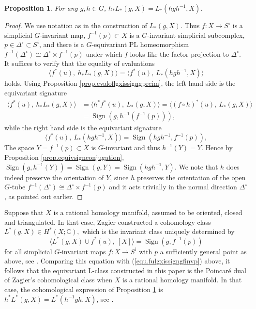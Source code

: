 \documentclass{amsart}
\newtheorem{prop}[thm]{Proposition}
\theoremstyle{definition}
\theoremstyle{remark}
\newcommand {\cplx}  {\ensuremath{\mathbb{C}}}
\newcommand {\Sign}    {{\ensuremath{\operatorname{Sign}}}}
\begin{document}
\begin{prop} \label{prop.equivlconjugation}
For any $g,h \in G$, $h_* L_* (g, X) = L_* (hgh^{-1}, X)$.
\end{prop}
\begin{proof}
We use notation as in the construction of $L_* (g,X)$.
Thus $f:X \to S^i$ is a simplicial $G$-invariant map,
$f^{-1} (p) \subset X$ is a $G$-invariant simplicial subcomplex,
$p\in \Delta^\circ \subset S^i$, 
and there is a $G$-equivariant PL homeomorphism
$f^{-1} (\Delta^\circ) \cong \Delta^\circ \times f^{-1} (p)$
under which $f$ looks like the factor projection to $\Delta^\circ$.
It suffices to verify that the equality of evaluations
\[  \langle f^* (u),~ h_* L_* (g,X) \rangle   
   = \langle f^* (u),~ L_* (hgh^{-1}, X) \rangle  \]
holds.
Using Proposition \ref{prop.evaloflgxissigngpreim},
the left hand side is the equivariant signature
\begin{align*}
 \langle f^* (u),~ h_* L_* (g,X) \rangle
&=  \langle h^* f^* (u),~ L_* (g,X) \rangle 
 =  \langle (f\circ h)^* (u),~ L_* (g,X) \rangle \\
&= \Sign (g, h^{-1} (f^{-1} (p))),
\end{align*}
while the right hand side is the equivariant signature
\[
 \langle f^* (u),~ L_* (hgh^{-1} ,X) \rangle
   = \Sign (hgh^{-1}, f^{-1} (p)),
\]
The space $Y = f^{-1} (p) \subset X$ is $G$-invariant and
thus $h^{-1} (Y)=Y$.
Hence by Proposition \ref{prop.equivsignconjugation},
$\Sign (g, h^{-1} (Y)) = \Sign (g,Y)
   = \Sign (hgh^{-1}, Y)$.
We note that $h$ does indeed preserve the orientation of $Y$, since
$h$ preserves the orientation of the open $G$-tube
$f^{-1} (\Delta^\circ) \cong \Delta^\circ \times f^{-1} (p)$
and it acts trivially in the normal direction $\Delta^\circ$,
as pointed out earlier.
\end{proof}

Suppose that $X$ is a rational homology manifold,
assumed to be oriented, closed and triangulated.
In that case, Zagier constructed a cohomology class
$L^* (g,X) \in H^* (X;\cplx),$ which is the invariant class uniquely determined
by
\[ \langle L^* (g,X) \cup f^* (u),~ [X] \rangle = \Sign (g,f^{-1} (p)) \]
for all simplicial $G$-invariant maps $f:X \to S^i$ with $p$ a sufficiently general
point as above, see \cite[p. 21, Thm. 1]{zagier}.
Comparing this equation with (\ref{equ.fulgxissigngfinvp}) above,
it follows that the equivariant L-class constructed in this paper is the
Poincar\'e dual of Zagier's cohomological class when $X$ is a rational
homology manifold. In that case, the cohomological expression
of Proposition \ref{prop.equivlconjugation} is $h^* L^* (g,X) = L^* (h^{-1} gh, X)$,
see \cite[p. 18 (16), p. 21 (3)]{zagier}.
\end{document}
